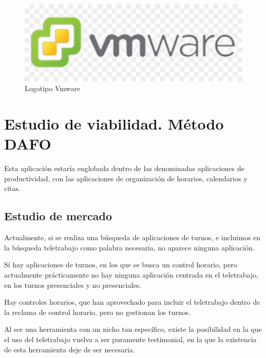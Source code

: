 \documentclass[11pt,spanish,listoffigures,listoftables]{tfgetsinf}
\begin{document}
\begin{figure}[!htb]
   \endminipage\hfill
     \includegraphics[width=\linewidth]{img/logo-vmware.jpg}
     \caption{Logotipo Vmware}\label{fig:LogoVmware}
   \endminipage
\end{figure}




\chapter{Estudio de viabilidad. Método DAFO}

Esta aplicación estaría englobada dentro de las denominadas aplicaciones de productividad, con las aplicaciones de organización de horarios, calendarios y citas.

\section{Estudio de mercado}

Actualmente, si se realiza una búsqueda de aplicaciones de turnos, e incluimos en la búsqueda teletrabajo como palabra necesaria, no aparece ninguna aplicación. 

Sí hay aplicaciones de turnos, en los que se busca un control horario, pero actualmente prácticamente no hay ninguna aplicación centrada en el teletrabajo, en los turnos presenciales y no presenciales.

Hay controles horarios, que han aprovechado para incluir el teletrabajo dentro de la reclama de control horario, pero no gestionan los turnos.

Al ser una herramienta con un nicho tan específico, existe la posibilidad en la que el uso del teletrabajo vuelva a ser puramente testimonial, en la que la existencia de esta herramienta deje de ser necesaria.
\end{document}
